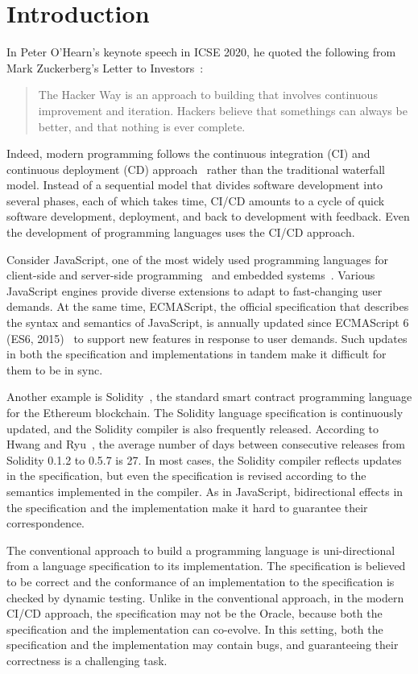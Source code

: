 \section{Introduction}\label{sec:intro}

In Peter O'Hearn's keynote speech in ICSE 2020, he quoted the following from
Mark Zuckerberg's Letter to Investors~\cite{mzletter}:
\begin{quote}
  The Hacker Way is an approach to building that involves continuous improvement
  and iteration.  Hackers believe that somethings can always be better, and that
  nothing is ever complete.
\end{quote}
Indeed, modern programming follows the continuous integration (CI) and
continuous deployment (CD) approach~\cite{cicd} rather than the traditional waterfall model.
Instead of a sequential model that divides software development into
several phases, each of which takes time, CI/CD amounts to a cycle of
quick software development, deployment, and back to development with
feedback. Even the development of programming languages uses the CI/CD approach.

Consider JavaScript, one of the most widely used programming languages
for client-side and server-side programming~\cite{nodejs} and
embedded systems~\cite{moddable,espruino,tessel2}.  Various JavaScript
engines provide diverse extensions to adapt to fast-changing user demands.  At
the same time, ECMAScript, the official specification that describes the syntax and
semantics of JavaScript, is annually updated since ECMAScript 6 (ES6,
2015)~\cite{es6} to support new features in response to user demands.
Such updates in both the specification and implementations in tandem make it
difficult for them to be in sync.

Another example is Solidity~\cite{officialSolDoc}, the standard smart contract programming language
for the Ethereum blockchain.  The Solidity language specification is continuously
updated, and the Solidity compiler is also frequently released.  According to
Hwang and Ryu~\cite{solidity-gap}, the average number of days between consecutive
releases from Solidity 0.1.2 to 0.5.7 is 27.  In most cases, the Solidity compiler reflects
updates in the specification, but even the specification is revised
according to the semantics implemented in the compiler.  As in JavaScript,
bidirectional effects in the specification and the implementation make
it hard to guarantee their correspondence.

The conventional approach to build a programming language is uni-directional from
a language specification to its implementation.  The specification is believed to
be correct and the conformance of an implementation to the specification is
checked by dynamic testing.  Unlike in the conventional approach, in the modern CI/CD
approach, the specification may not be the Oracle, because both the
specification and the implementation can co-evolve.  In this setting, both the
specification and the implementation may contain bugs, and guaranteeing their
correctness is a challenging task.

